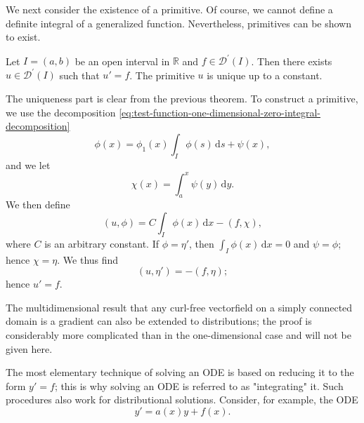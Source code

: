 We next consider the existence of a primitive. Of course, we cannot define a definite integral of a generalized function. Nevertheless, primitives can be shown to exist.

\begin{Theorem}
\label{thm:distribution-primitive-existence}
Let $I=(a,b)$ be an open interval in $\mathbb{R}$ and $f\in\mathcal{D}^{\prime}(I)$. Then there exists $u\in\mathcal{D}^{\prime}(I)$ such that $u'=f$. The primitive $u$ is unique up to a constant.
\end{Theorem}

\begin{Proof}
The uniqueness part is clear from the previous theorem. To construct a primitive, we use the decomposition \eqref{eq:test-function-one-dimensional-zero-integral-decomposition}
\begin{equation}\label{eq:primitive-construction-test-decomposition}
\phi(x)=\phi_1(x)\int_I\phi(s)\,\mathrm{d}s+\psi(x),
\end{equation}
and we let
\begin{equation}\label{eq:primitive-construction-zero-integral-test-primitive}
\chi(x)=\int_a^x\psi(y)\,\mathrm{d}y.
\end{equation}
We then define
\begin{equation}\label{eq:primitive-distribution-definition-pairing}
(u,\phi)=C\int_I\phi(x)\,\mathrm{d}x-(f,\chi),
\end{equation}
where $C$ is an arbitrary constant. If $\phi=\eta'$, then $\int_I\phi(x)\,\mathrm{d}x=0$ and $\psi=\phi$; hence $\chi=\eta$. We thus find
\begin{equation}\label{eq:primitive-distribution-derivative-check}
(u,\eta')=-(f,\eta);
\end{equation}
hence $u'=f$.
\end{Proof}

The multidimensional result that any curl-free vectorfield on a simply connected domain is a gradient can also be extended to distributions; the proof is considerably more complicated than in the one-dimensional case and will not be given here.

The most elementary technique of solving an ODE is based on reducing it to the form $y'=f$; this is why solving an ODE is referred to as "integrating" it. Such procedures also work for distributional solutions. Consider, for example, the ODE
\begin{equation}\label{eq:distribution-linear-first-order-ode}
y'=a(x)y+f(x).
\end{equation}


